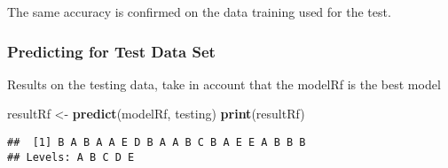 \documentclass[]{article}
\newenvironment{Shaded}{\begin{snugshade}}{\end{snugshade}}
\newcommand{\KeywordTok}[1]{\textcolor[rgb]{0.13,0.29,0.53}{\textbf{#1}}}
\newcommand{\StringTok}[1]{\textcolor[rgb]{0.31,0.60,0.02}{#1}}
\newcommand{\NormalTok}[1]{#1}
\begin{document}
The same accuracy is confirmed on the data training used for the test.

\subsubsection{Predicting for Test Data
Set}\label{predicting-for-test-data-set}

Results on the testing data, take in account that the modelRf is the
best model

\begin{Shaded}
\begin{Highlighting}[]
\NormalTok{resultRf <-}\StringTok{ }\KeywordTok{predict}\NormalTok{(modelRf, testing)}
\KeywordTok{print}\NormalTok{(resultRf)}
\end{Highlighting}
\end{Shaded}

\begin{verbatim}
##  [1] B A B A A E D B A A B C B A E E A B B B
## Levels: A B C D E
\end{verbatim}
\end{document}
